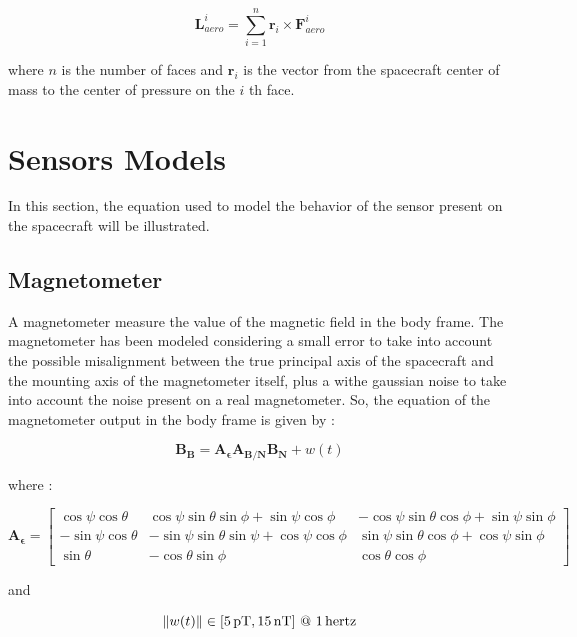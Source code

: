 \documentclass[11pt,a4paper]{report}
\begin{document}
\begin{equation}
 \mathbf{L}_{aero}^{i} = \sum\limits_{i=1}^n  \mathbf{r}_{i} \times \mathbf{F}_{aero}^{i}
\end{equation}

where $n$ is the number of faces and $\mathbf{r}_{i}$ is the vector from the spacecraft center of mass to the center of pressure on the $i$ th face.

\section{Sensors Models}
In this section, the equation used to model the behavior of the sensor present on the spacecraft will be illustrated.
\subsection{Magnetometer}
A magnetometer measure the value of the magnetic field in the body frame.
The magnetometer has been modeled considering a small error to take into account the possible misalignment between the true principal axis of the spacecraft and the mounting axis of the magnetometer itself, plus a withe gaussian noise to take into account the noise present on a real magnetometer.
So, the equation of the magnetometer output in the body frame is given by : 

\begin{equation}
 \mathbf{B_{B}} = \mathbf{A_{\epsilon}} \mathbf{A_{B/N}} \mathbf{B_{N}} + w(t)
\end{equation}

where : 

\begin{equation*}
 \mathbf{A_{\epsilon}} =
                                \begin{bmatrix}
                                    \cos\psi\cos\theta & \cos\psi\sin\theta\sin\phi + \sin\psi\cos\phi & -\cos\psi\sin\theta\cos\phi + \sin\psi\sin\phi \\
                                    -\sin\psi\cos\theta & -\sin\psi\sin\theta\sin\psi + \cos\psi\cos\phi & \sin\psi\sin\theta\cos\phi + \cos\psi\sin\phi \\
                                    \sin\theta & -\cos\theta\sin\phi & \cos\theta\cos\phi
                                \end{bmatrix}
\end{equation*}
 
and 

\begin{equation*}
 \norm{w(t)} \in [\SI{5}{\pico\tesla},\SI{15}{\nano\tesla}] \ @ \ \SI{1}{hertz}
\end{equation*}
\end{document}
